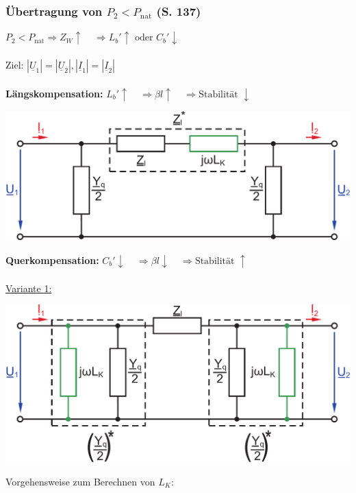 \documentclass[a4paper,twocolumn,10pt]{article}
\begin{document}
\subsubsection{Übertragung von $P_2<P_{\text{nat}}$ (S. 137)}
$P_2<P_{\text{nat}}\Rightarrow Z_W\uparrow\;\;\;\;\Rightarrow L_b'\uparrow\text{ oder }C_b'\downarrow$\\\\
Ziel: $|\underline{U}_1|=|\underline{U}_2|,|\underline{I}_1|=|\underline{I}_2|$\\\\
\textbf{Längskompensation:} $L_b'\uparrow\;\;\;\;\Rightarrow\beta l\uparrow\;\;\;\;\Rightarrow\text{Stabilität }\downarrow$
\begin{center}
\includegraphics[width=0.98\columnwidth]{Grafiken/Laengskompensation_1}
\end{center}
\vspace{0.3cm}
\textbf{Querkompensation:} $C_b'\downarrow\;\;\;\;\Rightarrow\beta l\downarrow\;\;\;\;\Rightarrow\text{Stabilität }\uparrow$\\\\
\underline{Variante 1:}
\begin{center}
\includegraphics[width=0.98\columnwidth]{Grafiken/Querkompensation_1}
\end{center}
Vorgehensweise zum Berechnen von $L_K$:
\end{document}
